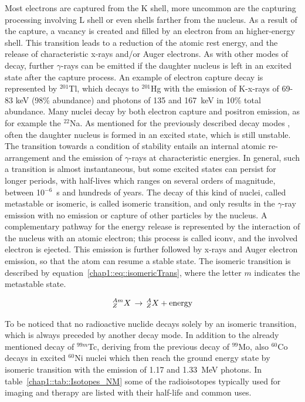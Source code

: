 Most electrons are captured from the K shell, more uncommon are the capturing processing involving L shell or even shells farther from the nucleus. As a result of the capture, a vacancy is created and filled by an electron from an higher-energy shell. This transition leads to a reduction of the atomic rest energy, and the release of characteristic x-rays and/or Auger electrons. As with other modes of decay, further $\gamma$-rays can be emitted if the daughter nucleus is left in an excited state after the capture process. An example of electron capture decay is represented by $^{201}$Tl, which decays to $^{201}$Hg with the emission of K-x-rays of 69-83 keV (98\% abundance) and photons of 135 and 167~keV in 10\% total abundance. Many nuclei decay by both electron capture and positron emission, as for example the $^{22}$Na.
As mentioned for the previously described decay modes , often the daughter nucleus is formed in an excited state, which is still unstable. The transition towards a condition of stability entails an internal atomic re-arrangement and the emission of $\gamma$-rays at characteristic energies. In general, such a transition is almost instantaneous, but some excited states can persist for longer periods, with half-lives which ranges on several orders of magnitude, between 10$^{-6}$~s and hundreds of years. The decay of this kind of nuclei, called metastable or isomeric, is called isomeric transition, and only results in the $\gamma$-ray emission with no emission or capture of other particles by the nucleus. A complementary pathway for the energy release is represented by the interaction of the nucleus with an atomic electron; this process is called \gls{iconv}, and the involved electron is ejected. This emission is further followed by x-rays and Auger electron emission, so that the atom can resume a stable state. The isomeric transition is described by equation~\ref{chap1::eq::isomericTrans}, where the letter $m$ indicates the metastable state.

 \begin{equation}\label{chap1::eq::isomericTrans}
^{Am}_{Z}X  \, \rightarrow \, ^{A}_{Z}X  + \mathrm{energy} \\
\end{equation}        

To be noticed that no radioactive nuclide decays solely by an isomeric transition, which is always preceded by another decay mode. In addition to the already mentioned decay of $^{99m}$Tc, deriving from the previous decay of $^{99}$Mo, also $^{60}$Co decays in excited $^{60}$Ni nuclei which then reach the ground energy state by isomeric transition with the emission of 1.17 and 1.33~MeV photons. 
In table~\ref{chap1::tab::Isotopes_NM} some of the radioisotopes typically used for imaging and therapy are listed with their half-life and common uses. 

